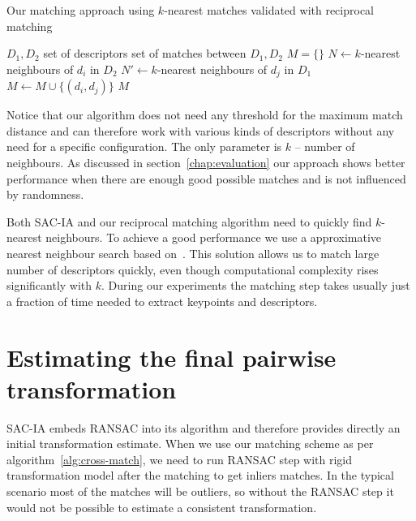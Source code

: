 \begin{algorithm}
    \caption[Reciprocal $k$-nearest matching]{Our matching approach using $k$-nearest matches validated with reciprocal matching}
    \label{alg:cross-match}
    \begin{algorithmic}[1]
        \Require $D_1, D_2$ set of descriptors
        \Ensure set of matches between $D_1, D_2$
            \State $M = \{\}$
                \State $N \gets k$-nearest neighbours of $d_i$ in $D_2$
                    \State $N' \gets k$-nearest neighbours of $d_j$ in $D_1$
                        \State $M \gets M \cup \{(d_i, d_j)\}$
                    \EndIf
                \EndFor
            \EndFor
            \State \Return $M$
        \EndFunction
    \end{algorithmic}
\end{algorithm}

Notice that our algorithm does not need any threshold for the maximum match distance and can therefore work with various kinds of descriptors without any need for a specific configuration. The only parameter is $k$ -- number of neighbours. As discussed in section~\ref{chap:evaluation} our approach shows better performance when there are enough good possible matches and is not influenced by randomness.

Both \gls{SAC-IA} and our reciprocal matching algorithm need to quickly find $k$-nearest neighbours. To achieve a good performance we use a approximative nearest neighbour search based on~\cite{muja2014flann}. This solution allows us to match large number of descriptors quickly, even though computational complexity rises significantly with $k$. During our experiments the matching step takes usually just a fraction of time needed to extract keypoints and descriptors.

\section{Estimating the final pairwise transformation}

\gls{SAC-IA} embeds \gls{RANSAC} into its algorithm and therefore provides directly an initial transformation estimate. When we use our matching scheme as per algorithm~\ref{alg:cross-match}, we need to run \gls{RANSAC} step with rigid transformation model after the matching to get inliers matches. In the typical scenario most of the matches will be outliers, so without the \gls{RANSAC} step it would not be possible to estimate a consistent transformation.

